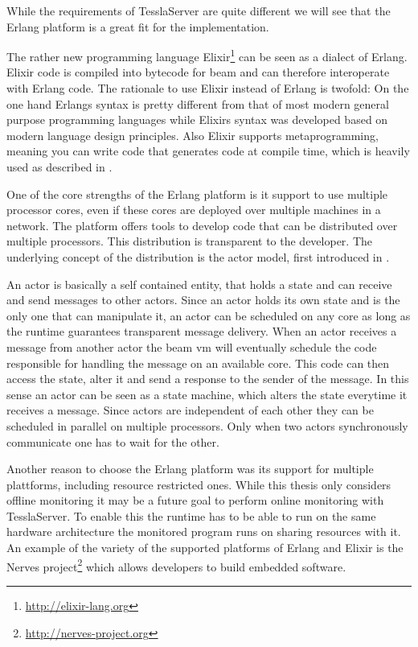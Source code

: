 While the requirements of TesslaServer are quite different we will see that the Erlang platform is a great fit for the implementation.

The rather new programming language Elixir\footnote{\url{http://elixir-lang.org}} can be seen as a dialect of Erlang.
Elixir code is compiled into bytecode for \gls{beam} and can therefore interoperate with Erlang code.
The rationale to use Elixir instead of Erlang is twofold:
On the one hand Erlangs syntax is pretty different from that of most modern general purpose programming languages while Elixirs syntax was developed based on modern language design principles.
Also Elixir supports metaprogramming, meaning you can write code that generates code at compile time, which is heavily used as described in .

One of the core strengths of the Erlang platform is it support to use multiple processor cores, even if these cores are deployed over multiple machines in a network.
The platform offers tools to develop code that can be distributed over multiple processors.
This distribution is transparent to the developer.
The underlying concept of the distribution is the actor model, first introduced in \cite{Hewitt1973}.

An actor is basically a self contained entity, that holds a state and can receive and send messages to other actors.
Since an actor holds its own state and is the only one that can manipulate it, an actor can be scheduled on any core as long as the runtime guarantees transparent message delivery.
When an actor receives a message from another actor the \gls{beam} \gls{vm} will eventually schedule the code responsible for handling the message on an available core.
This code can then access the state, alter it and send a response to the sender of the message.
In this sense an actor can be seen as a state machine, which alters the state everytime it receives a message.
Since actors are independent of each other they can be scheduled in parallel on multiple processors.
Only when two actors synchronously communicate one has to wait for the other.


Another reason to choose the Erlang platform was its support for multiple plattforms, including resource restricted ones.
While this thesis only considers offline monitoring it may be a future goal to perform online monitoring with TesslaServer.
To enable this the runtime has to be able to run on the same hardware architecture the monitored program runs on sharing resources with it.
An example of the variety of the supported platforms of Erlang and Elixir is the Nerves project\footnote{\url{http://nerves-project.org}} which allows developers to build embedded software.


